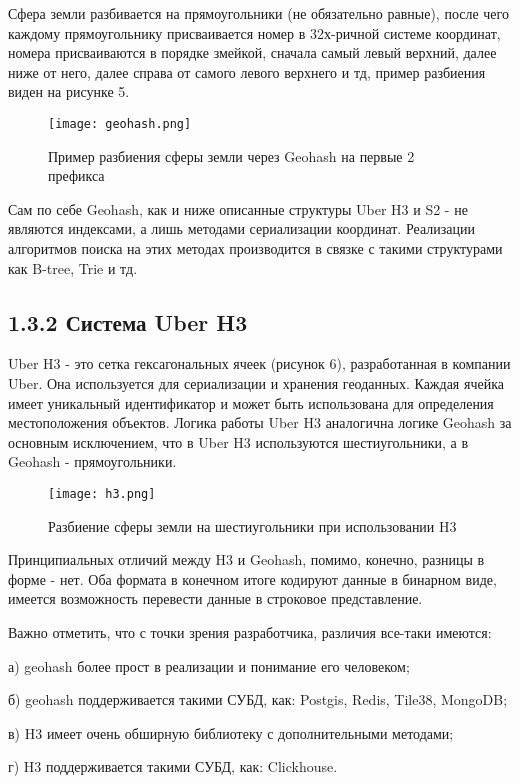 Сфера земли разбивается на прямоугольники (не обязательно равные), после чего каждому прямоугольнику присваивается номер в 32х-ричной системе координат, номера присваиваются в порядке змейкой, сначала самый левый верхний, далее ниже от него, далее справа от самого левого верхнего и тд, пример разбиения виден на рисунке 5.
\par\vspace{1em}
\begin{figure}[H]
    \centering
    \texttt{[image: geohash.png]}
    \caption{Пример разбиения сферы земли через Geohash на первые 2 префикса}
\end{figure}

Сам по себе Geohash, как и ниже описанные структуры Uber H3 и S2 - не являются индексами\cite{balkicGeohash}, а лишь методами сериализации координат. Реализации алгоритмов поиска на этих методах производится в связке с такими структурами как B-tree, Trie и тд. 

\subsection{1.3.2 Система Uber H3}
Uber H3 - это сетка гексагональных ячеек (рисунок 6), разработанная в компании Uber. Она используется для сериализации и хранения геоданных. Каждая ячейка имеет уникальный идентификатор и может быть использована для определения местоположения объектов. Логика работы Uber H3 аналогична логике Geohash за основным исключением, что в Uber H3 используются шестиугольники, а в Geohash - прямоугольники. 
  \\
\begin{figure}[H]
    \centering
    \texttt{[image: h3.png]}
    \caption{Разбиение сферы земли на шестиугольники при использовании H3}
\end{figure}

Принципиальных отличий между H3 и Geohash\cite{bohuiGeohashH2S2}, помимо, конечно, разницы в форме - нет. Оба формата в конечном итоге кодируют данные в бинарном виде, имеется возможность перевести данные в строковое представление.  

Важно отметить, что с точки зрения разработчика, различия все-таки имеются:
\par а) geohash более прост в реализации и понимание его человеком;
\par б) geohash поддерживается такими СУБД, как: Postgis, Redis, Tile38, MongoDB\cite{membreyMongodb};
\par в) H3 имеет очень обширную библиотеку с дополнительными методами;
\par г) H3 поддерживается такими СУБД, как: Clickhouse.

